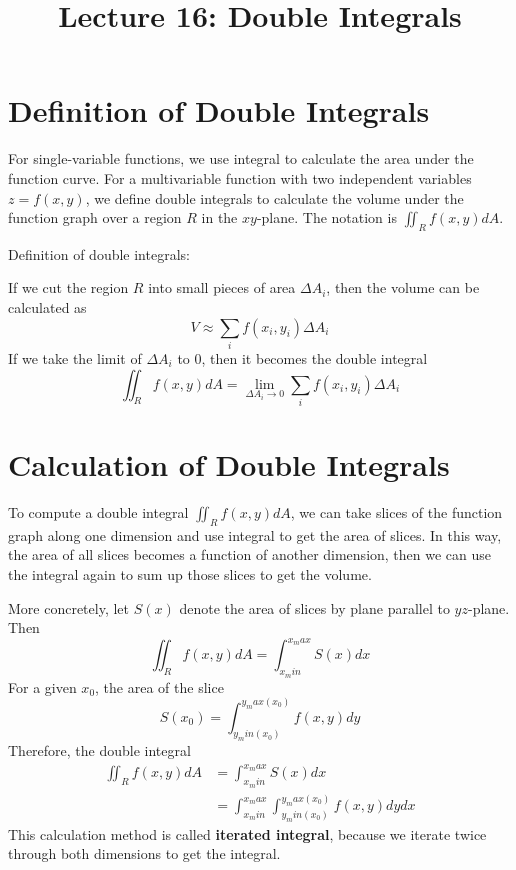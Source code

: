 \documentclass{article}
\title{Lecture 16: Double Integrals}
\author{}
\date{}
\begin{document}
    
\maketitle

\section{Definition of Double Integrals}

For single-variable functions, we use integral to calculate the area under the 
function curve. For a multivariable function with two independent variables 
$z = f(x, y)$, we define double integrals to calculate the volume under the 
function graph over a region $R$ in the $x$$y$-plane. The notation is 
$\iint_R f(x, y)dA$.

\bigskip

Definition of double integrals:

If we cut the region $R$ into small pieces of area $\Delta A_i$, then the volume 
can be calculated as 
\begin{equation*}
  V \approx \sum_i f(x_i, y_i) \Delta A_i
\end{equation*}
If we take the limit of $\Delta A_i$ to 0, then it becomes the double integral
\begin{equation*}
  \iint_R f(x, y) dA = \lim_{\Delta A_i \to 0} \sum_i f(x_i, y_i) \Delta A_i
\end{equation*}

\section{Calculation of Double Integrals}

To compute a double integral $\iint_R f(x, y) dA$, we can take slices of the 
function graph along one dimension and use integral to get the area of slices. 
In this way, the area of all slices becomes a function of another dimension, 
then we can use the integral again to sum up those slices to get the volume.

More concretely, let $S(x)$ denote the area of slices by plane parallel to 
$y$$z$-plane. Then
\begin{equation*}
  \iint_R f(x, y) dA = \int_{x_min}^{x_max} S(x) dx
\end{equation*}
For a given $x_0$, the area of the slice
\begin{equation*}
  S(x_0) = \int_{y_min(x_0)}^{y_max(x_0)} f(x, y) dy
\end{equation*}
Therefore, the double integral
\begin{equation*}
  \begin{split}
    \iint_R f(x, y) dA &= \int_{x_min}^{x_max} S(x) dx \\
                       &= \int_{x_min}^{x_max} \int_{y_min(x_0)}^{y_max(x_0)} f(x, y) dy dx
  \end{split}
\end{equation*}
This calculation method is called \textbf{iterated integral}, because we iterate 
twice through both dimensions to get the integral.
\end{document}
